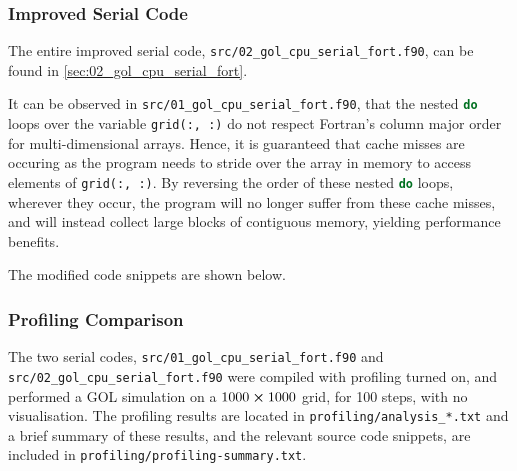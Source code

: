 \documentclass[]{article}
\begin{document}
\subsubsection{Improved Serial Code}
\label{sec:improved-serial-code}

The entire improved serial code,
\lstinline[style=ff]{src/02_gol_cpu_serial_fort.f90}, can be found in
\autoref{sec:02_gol_cpu_serial_fort}.

It can be observed in \lstinline[style=ff]{src/01_gol_cpu_serial_fort.f90},
that the nested \lstinline[language=Fortran]{do} loops over the variable
\lstinline[language=Fortran]{grid(:, :)} do not respect Fortran's column major
order for multi-dimensional arrays.
Hence, it is guaranteed that cache misses are occuring as the program needs to
stride over the array in memory to access elements of
\lstinline[language=Fortran]{grid(:, :)}.
By reversing the order of these nested \lstinline[language=Fortran]{do} loops,
wherever they occur, the program will no longer suffer from these cache misses,
and will instead collect large blocks of contiguous memory, yielding performance
benefits.

The modified code snippets are shown below.





\subsubsection{Profiling Comparison}
\label{sec:profiling-comparison}

The two serial codes,
\lstinline[style=ff]{src/01_gol_cpu_serial_fort.f90} and
\lstinline[style=ff]{src/02_gol_cpu_serial_fort.f90} were compiled with
profiling turned on, and performed a GOL simulation on a
$1000 \cross 1000$ grid, for 100 steps, with no visualisation.
The profiling results are located in
\lstinline[style=ff]{profiling/analysis_*.txt} and a brief summary of these
results, and the relevant source code snippets, are included in
\lstinline[style=ff]{profiling/profiling-summary.txt}.
\end{document}
